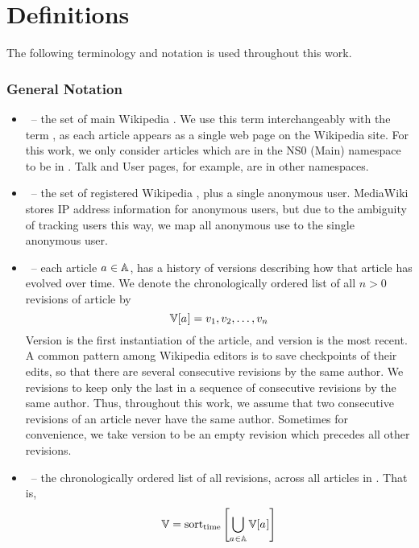 
\chapter{Definitions}
\label{ch:defs}

The following terminology and notation
is used throughout this work.

\renewcommand{\labelitemi}{}

\subsection{General Notation}
\begin{itemize}
\item \articles \ -- the set of main Wikipedia .
    We use this term interchangeably with the term ,
    as each article appears as a single web page on the Wikipedia site.
    For this work, we only consider articles which are in
    the NS0 (Main) namespace to be in \articles.
    Talk and User pages, for example, are in other namespaces.
\item \users \ -- the set of registered Wikipedia ,
    plus a single anonymous user.
    MediaWiki stores IP address information for anonymous users,
    but due to the ambiguity of tracking users this way,
    we map all anonymous use to the single anonymous user.
\item \versions{\article{}} \ -- each article $a_{} \in \mathbb{A}$,
    has a history of versions
    describing how that article has evolved over time.
    We denote the chronologically ordered list
    of all $n > 0$ revisions of article \article{} by
    \begin{equation}
	\versions{\article{}} =
		\version{1}, \version{2}, \ldots, \version{n}
    \end{equation}
    Version  is the first instantiation of the article,
    and version  is the most recent.
    A common pattern among Wikipedia editors is to save checkpoints
    of their edits, so that there are several consecutive revisions by
    the same author.
    We  revisions to keep only the last in a sequence of
    consecutive revisions by the same author.
    Thus, throughout this work, we assume that two consecutive revisions
    of an article never have the same author.
    Sometimes for convenience, we take version  to be
    an empty revision which precedes all other revisions.
\item \versions{} \ -- the chronologically ordered list of all
    revisions, across all articles in \articles.
    That is,
    \begin{equation}
    \versions{} = \mathrm{sort}_\mathrm{time}\left[
	\bigcup_{\article{} \in \articles} \versions{\article{}}
	\right]
    \end{equation}

\end{itemize}

